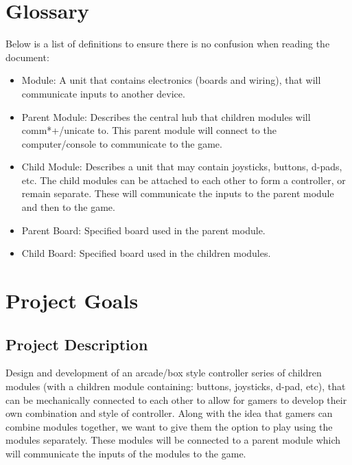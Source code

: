 \documentclass[a4]{article}
\begin{document}
\section{Glossary}
Below is a list of definitions to ensure there is no confusion when reading the document:
\begin{itemize}
    \item \textcolor{McMasterMaroon}{Module}: A unit that contains electronics (boards and wiring), that will communicate inputs to another device.
    \item \textcolor{McMasterMaroon}{Parent Module}: Describes the central hub that children modules will comm*+/unicate to. This parent module will connect to the computer/console to communicate to the game.
    \item \textcolor{McMasterMaroon}{Child Module}: Describes a unit that may contain joysticks, buttons, d-pads, etc. The child modules can be attached to each other to form a controller, or remain separate. These will communicate the inputs to the parent module and then to the game.
    \item \textcolor{McMasterMaroon}{Parent Board}: Specified board used in the parent module.
    \item \textcolor{McMasterMaroon}{Child Board}: Specified board used in the children modules.
\end{itemize}
\section{Project Goals}
\subsection{Project Description}
Design and development of an arcade/box style controller series of children modules (with a children module containing: buttons, joysticks, d-pad, etc), that can be mechanically 
connected to each other to allow for gamers to develop their own combination and style of controller. Along with the idea that gamers can combine modules together,
we want to give them the option to play using the modules separately. These modules will be connected to a parent module which will communicate the inputs of the
modules to the game.
\end{document}
